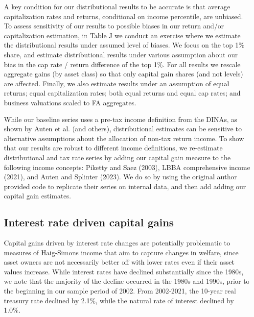 \documentclass[12pt]{article}
\begin{document}
A key condition for our distributional results to be accurate is that average capitalization rates and returns, conditional on income percentile, are unbiased. To assess sensitivity of our results to possible biases in our return and/or capitalization estimation, in Table J we conduct an exercise where we estimate the distributional results under assumed level of biases. We focus on the top 1\% share, and estimate distributional results under various assumption about our bias in the cap rate / return difference of the top 1\%.  For all results we rescale aggregate gains (by asset class) so that only capital gain shares (and not levels) are affected. Finally, we also estimate results under an assumption of equal returns; equal capitalization rates; both equal returns and equal cap rates; and business valuations scaled to FA aggregates. 

 While our baseline series uses a pre-tax income definition from the DINAs, as shown by Auten et al. (and others), distributional estimates can be sensitive to alternative assumptions about the allocation of non-tax return income. To show that our results are robust to different income definitions, we re-estimate  distributional and tax rate series by adding our capital gain measure to the following income concepts: Piketty and Saez (2003), LBBA comprehensive income (2021), and Auten and Splinter (2023). We do so by using the original author provided code to replicate their series on internal data, and then add adding our capital gain estimates. 

 \subsection{Interest rate driven capital gains}

 Capital gains driven by interest rate changes are potentially problematic to measures of Haig-Simons income that aim to capture changes in welfare, since asset owners are not necessarily better off with lower rates even if their asset values increase. While interest rates have declined substantially since the 1980s, we note that the majority of the decline  occurred in the 1980s and 1990s, prior to the beginning in our sample period of 2002. From 2002-2021, the 10-year real treasury rate declined by 2.1\%, while the natural rate of interest declined by 1.0\%.  
\end{document}
